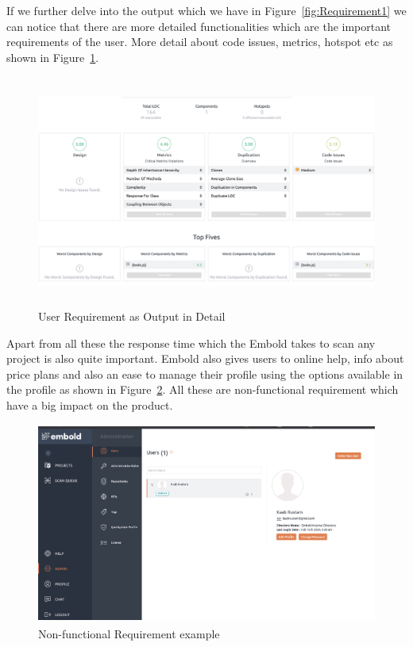 If we further delve into the output which we have in Figure~\ref{fig:Requirement1} we can notice that there are more detailed functionalities which are the important requirements of the user. More detail about code issues, metrics, hotspot etc as shown in Figure~\ref{fig:Requirement2}.\par
\begin{figure}[htbp]
\begin{center}
\includegraphics[width=6.5 in, height=3in]{requirement2.png}
\caption{User Requirement as Output in Detail ~\cite{emboldio}}
\label{fig:Requirement2}
\end{center}
\end{figure}
Apart from all these the response time which the Embold takes to scan any project is also quite important. Embold also gives users to online help, info about price plans and also an ease to manage their profile using the options available in the profile as shown in Figure~\ref{fig:Requirement3}. All these are non-functional requirement which have a big impact on the product. 
\begin{figure}[htbp]
\begin{center}
\includegraphics[width=6.5 in, height=2.6in]{Requirement3.png}
\caption{Non-functional Requirement example ~\cite{emboldio}} 
\label{fig:Requirement3}
\end{center}
\end{figure}
